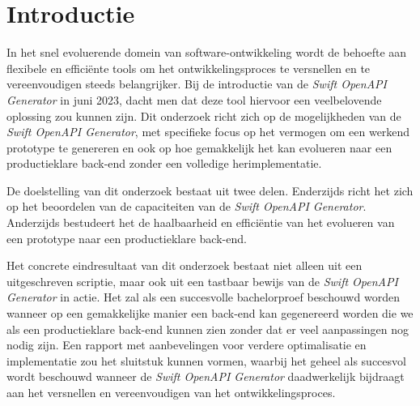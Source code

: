 
\section{Introductie}%
\label{sec:introductie}
In het snel evoluerende domein van software-ontwikkeling wordt de behoefte aan flexibele en efficiënte tools om het ontwikkelingsproces te versnellen en te vereenvoudigen steeds belangrijker. Bij de introductie van de \textit{Swift OpenAPI Generator} in juni 2023, dacht men dat deze tool hiervoor een veelbelovende oplossing zou kunnen zijn. Dit onderzoek richt zich op de mogelijkheden van de \textit{Swift OpenAPI Generator}, met specifieke focus op het vermogen om een werkend prototype te genereren en ook op hoe gemakkelijk het kan evolueren naar een productieklare back-end zonder een volledige herimplementatie. 

De doelstelling van dit onderzoek bestaat uit twee delen. Enderzijds richt het zich op het beoordelen van de capaciteiten van de \textit{Swift OpenAPI Generator}. Anderzijds bestudeert het de haalbaarheid en efficiëntie van het evolueren van een prototype naar een productieklare back-end. 

Het concrete eindresultaat van dit onderzoek bestaat niet alleen uit een uitgeschreven scriptie, maar ook uit een tastbaar bewijs van de \textit{Swift OpenAPI Generator} in actie. Het zal als een succesvolle bachelorproef beschouwd worden wanneer op een gemakkelijke manier een back-end kan gegenereerd worden die we als een productieklare back-end kunnen zien zonder dat er veel aanpassingen nog nodig zijn. Een rapport met aanbevelingen voor verdere optimalisatie en implementatie zou het sluitstuk kunnen vormen, waarbij het geheel als succesvol wordt beschouwd wanneer de \textit{Swift OpenAPI Generator} daadwerkelijk bijdraagt aan het versnellen en vereenvoudigen van het ontwikkelingsproces.  


